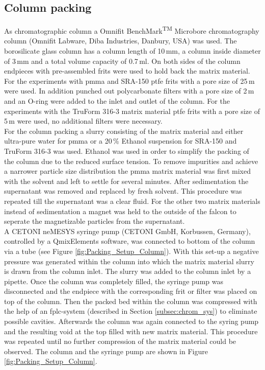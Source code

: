 \subsection{Column packing}
\label{subsec:col_pack}
As chromatographic column a Omnifit\textsuperscript{\textregistered} BenchMark\textsuperscript{TM} Microbore chromatography column (Omnifit Labware, Diba Industries, Danbury, USA) was used. The borosilicate glass column has a column length of 10\,mm, a column inside diameter of 3\,mm and a total volume capacity of 0.7\,ml. On both sides of the column endpieces with pre-assembled frits were used to hold back the matrix material. For the experiments with \gls{pmma} and SRA-150 \gls{ptfe} frits with a pore size of 25\,\textmu m were used. In addition punched out polycarbonate filters with a pore size of 2\,\textmu m and an O-ring were added to the inlet and outlet of the column. For the experiments with the TruForm 316-3 matrix material \gls{ptfe} frits with a pore size of 5\,\textmu m were used, no additional filters were necessary. \\   
For the column packing a slurry consisting of the matrix material and either ultra-pure water for \gls{pmma} or a 20\,\% Ethanol suspension for SRA-150 and TruForm 316-3 was used. Ethanol was used in order to simplify the packing of the column due to the reduced surface tension. To remove impurities and achieve a narrower particle size distribution the \gls{pmma} matrix material was first mixed with the solvent and left to settle for several minutes. After sedimentation the supernatant was removed and replaced by fresh solvent. This procedure was repeated till the supernatant was a clear fluid. For the other two matrix materials instead of sedimentation a magnet was held to the outside of the falcon to seperate the magnetizable particles from the supernatant.\\   
A CETONI neMESYS syringe pump (CETONI GmbH, Korbussen, Germany), controlled by a QmixElements software, was connected to bottom of the column via a tube (see Figure \ref{fig:Packing_Setup_Column}). With this set-up a negative pressure was generated within the column into which the matrix material slurry is drawn from the column inlet. The slurry was added to the column inlet by a pipette. Once the column was completely filled, the syringe pump was disconnected and the endpiece with the corresponding frit or filter was placed on top of the column. Then the packed bed within the column was compressed with the help of an \gls{fplc}-system (described in Section \ref{subsec:chrom_sys}) to eliminate possible cavities. Afterwards the column was again connected to the syring pump and the resulting void at the top filled with new matrix material. This procedure was repeated until no further compression of the matrix material could be observed. The column and the syringe pump are shown in Figure \ref{fig:Packing_Setup_Column}.

